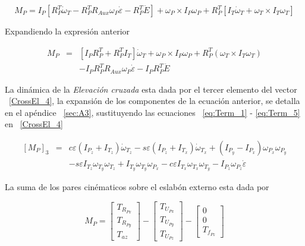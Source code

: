 \begin{equation}
M_P=I_{P}\left[ R_{P}^{T}\dot{\omega} _{T} - R_{P}^{T}R_{Aux}\omega _{P}\dot{\varepsilon } - R_{P}^{T}\ddot{E} \right]+ \omega_P \times I_{P}\omega_P + R_{P}^{T} \left[  I_{T}\dot{\omega}_{T} + \omega _{T} \times I_{T}\omega_T \right]
\label{CrossEl_3}
\end{equation}

Expandiendo la expresi\'{o}n anterior

\begin{equation}
\begin{array}{rcl}
M_P&=& \left[ I_{P} R_{P}^{T} + R_{P}^{T} I_{T} \right] \dot{\omega}_{T} + \omega_P \times I_{P}\omega_P  + R_{P}^{T}\left(\omega _{T} \times I_{T}\omega_T \right)\\
& & - I_{P}R_{P}^{T}R_{Aux}\omega _{P}\dot{\varepsilon } - I_{P} R_{P}^{T}\ddot{E} 
\end{array}
\label{CrossEl_4}
\end{equation}

La din\'{a}mica de la \textit{Elevaci\'{o}n cruzada} esta dada por el tercer elemento del vector ~\ref{CrossEl_4}, la expansi\'{o}n de los componentes de la ecuaci\'{o}n anterior, se detalla en el ap\'{e}ndice ~\ref{sec:A3}, sustituyendo las ecuaciones ~\ref{eq:Term_1} - \ref{eq:Term_5} en ~\ref{CrossEl_4}

\begin{equation}
\begin{array}{rcl}
\left[ M_P \right]_3&=&c\varepsilon \left( I_{P_z}+I_{T_z} \right)\dot{\omega}_{T_z} - s\varepsilon \left( I_{P_z}+I_{T_x} \right)\dot{\omega}_{T_x} + \left( I_{P_y}-I_{P_x} \right) \omega_{P_x} \omega_{P_y}\\
 & & - s\varepsilon I_{T_z} \omega_{T_y} \omega_{T_z} + I_{T_y} \omega_{T_y} \omega_{P_x} - c\varepsilon I_{T_x} \omega_{T_x} \omega_{T_y} - I_{P_z} \omega_{P_z}\dot{\varepsilon}
 \end{array}
 \label{CrossEl_5}
\end{equation}

La suma de los pares cin\'{e}maticos sobre el eslab\'{o}n externo esta dada por

\begin{equation}
M_P=\left[
\begin{array}{c}
T_{R_{Px}} \\ T_{R_{Py}} \\ T_{az}
\end{array}\right] -
\left[\begin{array}{c}
T_{U_{Px}} \\ T_{U_{Py}} \\ T_{U_{Pz}}
\end{array}\right]-
\left[
\begin{array}{c}
0 \\ 0 \\ T_{f_{Pz}}
\end{array} \right]
\label{eq:M_pan}
\end{equation}

